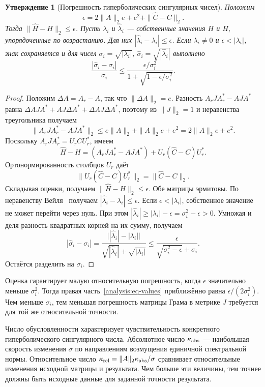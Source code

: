 \documentclass[a4paper,12pt]{article}
\theoremstyle{csstyle}
\newtheorem{proposition}[theorem]{Утверждение}
\begin{document}
\begin{proposition}[Погрешность гиперболических сингулярных чисел]
\label{analysis:prop-gram}
Положим
\[
\epsilon=2\|A\|_2e+e^2+\|\widehat C-C\|_2.
\]
Тогда $\|\widehat H-H\|_2\le\epsilon$.
Пусть $\lambda_i$ и $\widehat\lambda_i$ --- собственные значения
$H$ и $\widehat H$, упорядоченные по возрастанию. Для них
$|\widehat\lambda_i-\lambda_i|\le\epsilon$.
Если $\lambda_i\ne0$ и $\epsilon<|\lambda_i|$, знак сохраняется и
для чисел $\sigma_i=\sqrt{|\lambda_i|}$,
$\widehat\sigma_i=\sqrt{|\widehat\lambda_i|}$ выполнено
\begin{equation}\label{analysis:eq-values}
\frac{|\widehat\sigma_i-\sigma_i|}{\sigma_i}
\le\frac{\epsilon/\sigma_i^2}
{1+\sqrt{1-\epsilon/\sigma_i^2}}.
\end{equation}
\end{proposition}
\begin{proof}
Положим $\Delta A=A_r-A$, так что $\|\Delta A\|_2=e$. Разность
$A_rJA_r^*-AJA^*$ равна
$\Delta AJA^*+AJ\Delta A^*+\Delta AJ\Delta A^*$,
поэтому из $\|J\|_2=1$ и неравенства треугольника получаем
\[
\|A_rJA_r^*-AJA^*\|_2
\le e\|A\|_2+\|A\|_2e+e^2=2\|A\|_2e+e^2.
\]
Поскольку $A_rJA_r^*=U_rCU_r^*$, имеем
\[
\widehat H-H=(A_rJA_r^*-AJA^*)+U_r(\widehat C-C)U_r^*.
\]
Ортонормированность столбцов $U_r$ даёт
\[
\|U_r(\widehat C-C)U_r^*\|_2=\|\widehat C-C\|_2.
\]
Складывая оценки, получаем $\|\widehat H-H\|_2\le\epsilon$.
Обе матрицы эрмитовы. По неравенству Вейля~\cite[теорема~3.2]{Drmac2021}
получаем $|\widehat\lambda_i-\lambda_i|\le\epsilon$.
Если $\epsilon<|\lambda_i|$, собственное значение не может перейти
через нуль. При этом
$|\widehat\lambda_i|\ge|\lambda_i|-\epsilon=\sigma_i^2-\epsilon>0$.
Умножая и деля разность квадратных корней на их сумму, получаем
\[
|\widehat\sigma_i-\sigma_i|
=\frac{\bigl||\widehat\lambda_i|-|\lambda_i|\bigr|}
{\sqrt{|\widehat\lambda_i|}+\sqrt{|\lambda_i|}}
\le\frac{\epsilon}{\sqrt{\sigma_i^2-\epsilon}+\sigma_i}.
\]
Остаётся разделить на $\sigma_i$.
\end{proof}

Оценка гарантирует малую относительную погрешность, когда
$\epsilon$ значительно меньше $\sigma_i^2$. Тогда правая
часть~\eqref{analysis:eq-values} приближённо равна
$\epsilon/(2\sigma_i^2)$. Чем меньше $\sigma_i$, тем меньшая
погрешность матрицы Грама в метрике $J$ требуется для той же относительной точности.


Число обусловленности характеризует чувствительность конкретного
гиперболического сингулярного числа. Абсолютное число $\kappa_{\rm abs}$ ---
наибольшая скорость изменения $\sigma$ по направлениям возмущения
единичной спектральной нормы. Относительное число
$\kappa_{\rm rel}=\|A\|_2\kappa_{\rm abs}/\sigma$ сравнивает
относительные изменения исходной матрицы и результата. Чем больше эти величины,
тем точнее должны быть исходные данные для заданной точности результата.
\end{document}
